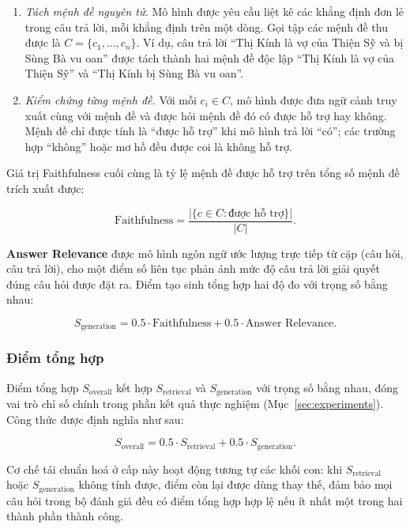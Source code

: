 \begin{enumerate}
  \item \textit{Tách mệnh đề nguyên tử.} Mô hình được yêu cầu liệt kê các khẳng định đơn lẻ trong câu trả lời, mỗi khẳng định trên một dòng. Gọi tập các mệnh đề thu được là $C = \{c_1, \ldots, c_n\}$. Ví dụ, câu trả lời ``Thị Kính là vợ của Thiện Sỹ và bị Sùng Bà vu oan'' được tách thành hai mệnh đề độc lập ``Thị Kính là vợ của Thiện Sỹ'' và ``Thị Kính bị Sùng Bà vu oan''.

  \item \textit{Kiểm chứng từng mệnh đề.} Với mỗi $c_i \in C$, mô hình được đưa ngữ cảnh truy xuất cùng với mệnh đề và được hỏi mệnh đề đó có được hỗ trợ hay không. Mệnh đề chỉ được tính là ``được hỗ trợ'' khi mô hình trả lời ``có''; các trường hợp ``không'' hoặc mơ hồ đều được coi là không hỗ trợ.
\end{enumerate}

Giá trị Faithfulness cuối cùng là tỷ lệ mệnh đề được hỗ trợ trên tổng số mệnh đề trích xuất được:

\begin{equation}
\text{Faithfulness} = \frac{|\{c \in C : \text{được hỗ trợ}\}|}{|C|}.
\end{equation}

\textbf{Answer Relevance} được mô hình ngôn ngữ ước lượng trực tiếp từ cặp (câu hỏi, câu trả lời), cho một điểm số liên tục phản ánh mức độ câu trả lời giải quyết đúng câu hỏi được đặt ra. Điểm tạo sinh tổng hợp hai độ đo với trọng số bằng nhau:

\begin{equation}
S_{\text{generation}} = 0.5 \cdot \text{Faithfulness} + 0.5 \cdot \text{Answer Relevance}.
\end{equation}

\subsubsection{Điểm tổng hợp}

Điểm tổng hợp $S_{\text{overall}}$ kết hợp $S_{\text{retrieval}}$ và $S_{\text{generation}}$ với trọng số bằng nhau, đóng vai trò chỉ số chính trong phần kết quả thực nghiệm (Mục~\ref{sec:experiments}). Công thức được định nghĩa như sau:

\begin{equation}
S_{\text{overall}} = 0.5 \cdot S_{\text{retrieval}} + 0.5 \cdot S_{\text{generation}}.
\end{equation}

Cơ chế tái chuẩn hoá ở cấp này hoạt động tương tự các khối con: khi $S_{\text{retrieval}}$ hoặc $S_{\text{generation}}$ không tính được, điểm còn lại được dùng thay thế, đảm bảo mọi câu hỏi trong bộ đánh giá đều có điểm tổng hợp hợp lệ nếu ít nhất một trong hai thành phần thành công.

